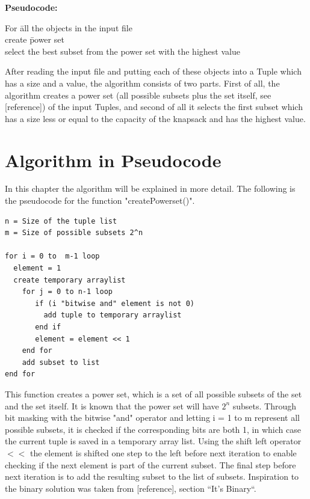 \documentclass{inc/mas}
\begin{document}
\noindent \textbf{Pseudocode:}
\begin{tabbing}
For \= all the objects in the input file \\
\> create \= power set	\\
\> select the best subset from the power set with the highest value\\
\end{tabbing}

After reading the input file and putting each of these objects into a Tuple which has a size and a value, the algorithm consists of two parts. First of all, the algorithm creates a power set (all possible subsets plus the set itself, see [reference]) of the input Tuples, and second of all it selects the first subset which has a size less or equal to the capacity of the knapsack and has the highest value.\\
 

\section{Algorithm in Pseudocode}
In this chapter the algorithm will be explained in more detail. The following is the pseudocode for the function "createPowerset()". \newline

\begin{lstlisting}
n = Size of the tuple list 	
m = Size of possible subsets 2^n

for i = 0 to  m-1 loop
  element = 1  
  create temporary arraylist  
    for j = 0 to n-1 loop
       if (i "bitwise and" element is not 0)
         add tuple to temporary arraylist
       end if
       element = element << 1
    end for
    add subset to list
end for
\end{lstlisting}

\noindent This function creates a power set, which is a set of all possible subsets of the set and the set itself. It is known that the power set will have $2^n$ subsets. Through bit masking with the bitwise "and" operator and letting i = 1 to m represent all possible subsets, it is checked if the corresponding bits are both 1, in which case the current tuple is saved in a temporary array list. Using the shift left operator $<<$ the element is shifted one step to the left before next iteration to enable checking if the next element is part of the current subset. The final step before next iteration is to add the resulting subset to the list of subsets. Inspiration to the binary solution was taken from [reference], section ``It's Binary``. \\ \\ 
\end{document}
